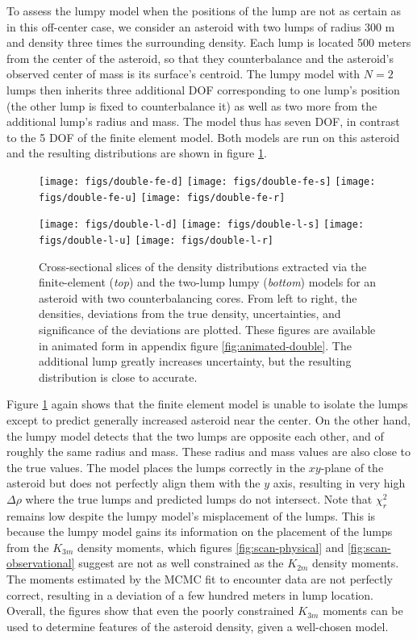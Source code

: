 \documentclass[fleqn,usenatbib]{mnras}
\begin{document}
To assess the lumpy model when the positions of the lump are not as certain as in this off-center case, we consider an asteroid with two lumps of radius 300 m and density three times the surrounding density. Each lump is located 500 meters from the center of the asteroid, so that they counterbalance and the asteroid's observed center of mass is its surface's centroid. The lumpy model with $N=2$ lumps then inherits three additional DOF corresponding to one lump's position (the other lump is fixed to counterbalance it) as well as two more from the additional lump's radius and mass. The model thus has seven DOF, in contrast to the 5 DOF of the finite element model. Both models are run on this asteroid and the resulting distributions are shown in figure \ref{fig:den-double}.

\begin{figure}
  \texttt{[image: figs/double-fe-d]}\hfill
  \texttt{[image: figs/double-fe-s]}\hfill
  \texttt{[image: figs/double-fe-u]}\hfill
  \texttt{[image: figs/double-fe-r]}

  \texttt{[image: figs/double-l-d]}\hfill
  \texttt{[image: figs/double-l-s]}\hfill
  \texttt{[image: figs/double-l-u]}\hfill
  \texttt{[image: figs/double-l-r]}

  \caption{Cross-sectional slices of the density distributions extracted via the finite-element (\textit{top}) and the two-lump lumpy (\textit{bottom}) models for an asteroid with two counterbalancing cores. From left to right, the densities, deviations from the true density, uncertainties, and significance of the deviations are plotted. These figures are available in animated form in appendix figure \ref{fig:animated-double}. The additional lump greatly increases uncertainty, but the resulting distribution is close to accurate.}
  \label{fig:den-double}
\end{figure}

Figure \ref{fig:den-double} again shows that the finite element model is unable to isolate the lumps except to predict generally increased asteroid near the center. On the other hand, the lumpy model detects that the two lumps are opposite each other, and of roughly the same radius and mass. These radius and mass values are also close to the true values. The model places the lumps correctly in the $xy$-plane of the asteroid but does not perfectly align them with the $y$ axis, resulting in very high $\Delta \rho$ where the true lumps and predicted lumps do not intersect. Note that $\chi^2_r$ remains low despite the lumpy model's misplacement of the lumps. This is because the lumpy model gains its information on the placement of the lumps from the $K_{3m}$ density moments, which figures \ref{fig:scan-physical} and \ref{fig:scan-observational} suggest are not as well constrained as the $K_{2m}$ density moments. The moments estimated by the MCMC fit to encounter data are not perfectly correct, resulting in a deviation of a few hundred meters in lump location. Overall, the figures show that even the poorly constrained $K_{3m}$ moments can be used to determine features of the asteroid density, given a well-chosen model.
\end{document}
